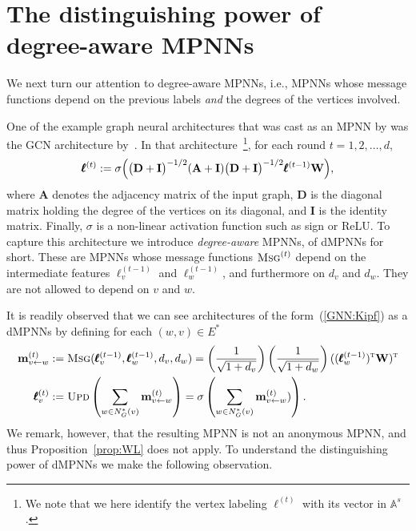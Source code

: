 \section{The distinguishing power of degree-aware MPNNs}\label{sec:dMPNNs}
We next turn our attention to degree-aware MPNNs, i.e., MPNNs whose message functions depend on the previous labels \textit{and} the degrees of the vertices involved.

One of the example graph neural architectures that was cast as an MPNN by \citet{GilmerSRVD17}
was the GCN architecture by~\citet{KipfW16}. In that architecture~\footnote{We note that we here identify the vertex labeling $\pmb{\ell}^{(t)}$ with its vector in $\mathbb{A}^s$.}, for each round $t=1,2,\ldots,d$,
\begin{equation}
\pmb{\ell}^{(t)}:=\sigma\Bigl(\bigl(\mathbf{D}+\mathbf{I}\bigr)^{-1/2} (\mathbf{A}+\mathbf{I})\bigl(\mathbf{D}+\mathbf{I}\bigr)^{-1/2} \pmb{\ell}^{(t-1)}\mathbf{W}\Bigr), \label{GNN:Kipf}
\end{equation}
where $\mathbf{A}$ denotes the adjacency matrix of the input graph, $\mathbf{D}$ is the diagonal matrix holding the degree of the vertices on its diagonal, and $\mathbf{I}$ is the identity matrix. Finally, $\sigma$ is a non-linear activation function such as sign or ReLU. To capture this architecture we  introduce \textit{degree-aware} MPNNs, of dMPNNs for short. These are MPNNs
whose message functions $\textsc{Msg}^{(t)}$ depend on the intermediate features $\pmb{\ell}^{(t-1)}_v$ and $\pmb{\ell}^{(t-1)}_w$, and furthermore on $d_v$ and $d_w$. They are not allowed to depend on  $v$ and $w$.

It is readily observed that we can see architectures of the form~(\ref{GNN:Kipf}) as a dMPNNs by defining for each $(w,v)\in E^*$
\begin{align*}
\mathbf{m}_{v\gets w}^{(t)}&:=	
\textsc{Msg}(\pmb{\ell}^{(t-1)}_v,\pmb{\ell}^{(t-1)}_w,d_v,d_w)=
	\left(\frac{1}{\sqrt{1+d_v}}\right)	\left(\frac{1}{\sqrt{1+d_w}}\right)((\pmb{\ell}^{(t-1)}_w)^{\textsc{t}}\mathbf{W})^{\textsc{t}}\\
\pmb{\ell}_v^{(t)}&:=\textsc{Upd}\left(\sum_{w\in N_G^*(v)} \mathbf{m}_{v\gets w}^{(t)}\right)=
\sigma\left(\sum_{w\in N_G^*(v)} \mathbf{m}_{v\gets w}^{(t)})\right).
\end{align*}
We remark, however, that the resulting MPNN is not an anonymous MPNN, and thus Proposition~\ref{prop:WL} does not apply. To understand the distinguishing power of dMPNNs we make the following observation. 

